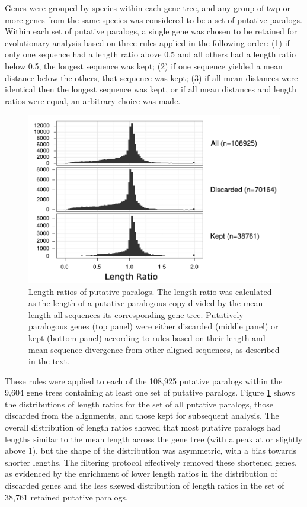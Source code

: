 Genes were grouped by species within each gene tree, and any group of
twp or more genes from the same species was considered to be a set of
putative paralogs. Within each set of putative paralogs, a single gene
was chosen to be retained for evolutionary analysis based on three
rules applied in the following order: (1) if only one sequence had a
length ratio above 0.5 and all others had a length ratio below 0.5,
the longest sequence was kept; (2) if one sequence yielded a mean
distance below the others, that sequence was kept; (3) if all mean
distances were identical then the longest sequence was kept, or if all
mean distances and length ratios were equal, an arbitrary choice was
made.

\begin{figure}
\centering
\includegraphics[scale=0.9]{Figs/mammals_paralogs_hist.pdf}
\caption{Length ratios of putative paralogs. The length ratio was
  calculated as the length of a putative paralogous copy divided by
  the mean length all sequences its corresponding gene
  tree. Putatively paralogous genes (top panel) were either discarded
  (middle panel) or kept (bottom panel) according to rules based on
  their length and mean sequence divergence from other aligned
  sequences, as described in the text.}
\label{filtered_paralogs_hist}
\end{figure}

These rules were applied to each of the 108,925 putative paralogs
within the 9,604 gene trees containing at least one set of putative
paralogs. Figure \ref{filtered_paralogs_hist} shows the distributions
of length ratios for the set of all putative paralogs, those discarded
from the alignments, and those kept for subsequent analysis. The
overall distribution of length ratios showed that most putative
paralogs had lengths similar to the mean length across the gene tree
(with a peak at or slightly above 1), but the shape of the
distribution was asymmetric, with a bias towards shorter lengths. The
filtering protocol effectively removed these shortened genes, as
evidenced by the enrichment of lower length ratios in the distribution
of discarded genes and the less skewed distribution of length ratios
in the set of 38,761 retained putative paralogs.

